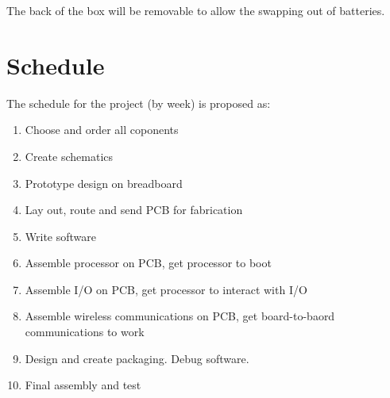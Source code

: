 \documentclass[aps,letterpaper,10pt]{revtex4}
\begin{document}
The back of the box will be removable to allow the swapping out of batteries. \\

\section{Schedule}
The schedule for the project (by week) is proposed as:
\begin{enumerate}
\item Choose and order all coponents
\item Create schematics
\item Prototype design on breadboard
\item	Lay out, route and send PCB for fabrication
\item	Write software
\item	Assemble processor on PCB, get processor to boot 
\item	Assemble I/O on PCB, get processor to interact with I/O
\item	Assemble wireless communications on PCB, get board-to-baord communications to work
\item Design and create packaging. Debug software.
\item Final assembly and test
\end{enumerate}

\end{document}
